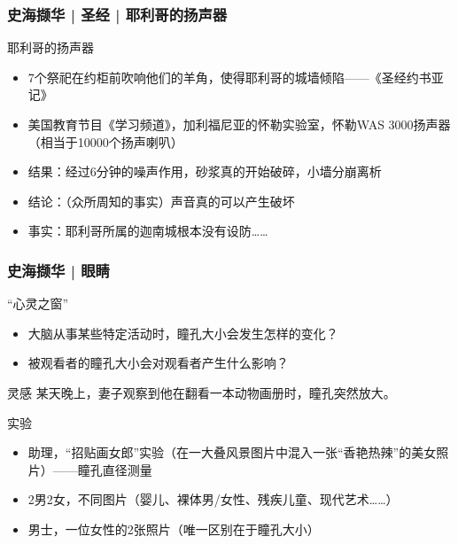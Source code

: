 \begin{frame}
  \frametitle{史海撷华 | 圣经 | 耶利哥的扬声器}
  \begin{block}{耶利哥的扬声器}
    \begin{itemize}
      \item 7个祭祀在约柜前吹响他们的羊角，使得耶利哥的城墙倾陷——《圣经\textbullet 约书亚记》
      \item 美国教育节目《学习频道》，加利福尼亚的怀勒实验室，怀勒WAS 3000扬声器（相当于10000个扬声喇叭）
      \item 结果：经过6分钟的噪声作用，砂浆真的开始破碎，小墙分崩离析
      \item 结论：（众所周知的事实）声音真的可以产生破坏
      \item 事实：耶利哥所属的迦南城根本没有设防……
    \end{itemize}
  \end{block}
\end{frame}

\begin{frame}
  \frametitle{史海撷华 | 眼睛}
  \begin{block}{“心灵之窗”}
    \begin{itemize}
      \item 大脑从事某些特定活动时，瞳孔大小会发生怎样的变化？
      \item 被观看者的瞳孔大小会对观看者产生什么影响？
    \end{itemize}
  \end{block}
  \pause
  \begin{block}{灵感}
    某天晚上，妻子观察到他在翻看一本动物画册时，瞳孔突然放大。
  \end{block}
  \pause
  \begin{block}{实验}
    \begin{itemize}
      \item 助理，“招贴画女郎”实验（在一大叠风景图片中混入一张“香艳热辣”的美女照片）——瞳孔直径测量
      \item 2男2女，不同图片（婴儿、裸体男/女性、残疾儿童、现代艺术……）
      \item 男士，一位女性的2张照片（唯一区别在于瞳孔大小）
    \end{itemize}
  \end{block}
\end{frame}

